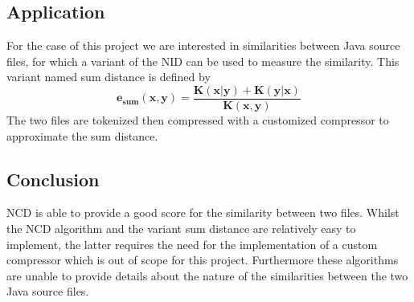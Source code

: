 \subsection{Application}
For the case of this project we are interested in similarities between Java source files, for which a variant of the NID can be used to measure the similarity. This variant named sum distance is defined by
\begin{equation}
    \boldsymbol{e_{\mathbf{sum}}(x,y) = \frac{K(x|y)+K(y|x)}{K(x,y)}}
\end{equation}
The two files are tokenized then compressed with a customized compressor to approximate the sum distance. 

\subsection{Conclusion}
NCD is able to provide a good score for the similarity between two files. Whilst the NCD algorithm and the variant sum distance are relatively easy to implement, the latter requires the need for the implementation of a custom compressor which is out of scope for this project. Furthermore these algorithms are unable to provide details about the nature of the similarities between the two Java source files. \\
\break